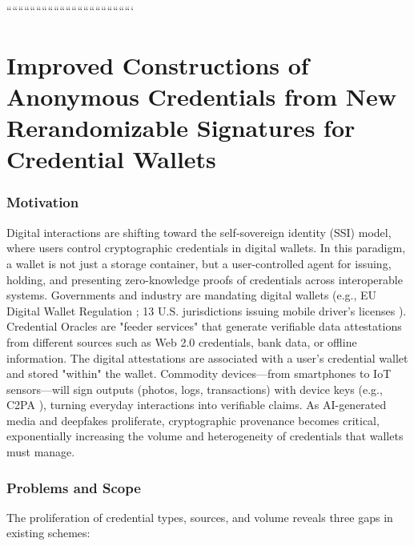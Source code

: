 ```````````````````````````````````````````\chapter{Improved Constructions of Anonymous Credentials from New Rerandomizable Signatures for Credential Wallets}\label{chap2}


\subsection{Motivation}

Digital interactions are shifting toward the self‑sovereign identity (SSI) model, where users control cryptographic credentials in digital wallets. In this paradigm, a wallet is not just a storage container, but a user-controlled agent for issuing, holding, and presenting zero-knowledge proofs of credentials across interoperable systems. Governments and industry are mandating digital wallets (e.g., EU Digital Wallet Regulation \cite{noauthor_regulation_2024}; 13 U.S. jurisdictions issuing mobile driver’s licenses \cite{aamva_jurisdiction_nodate}). Credential Oracles \cite{zhang_deco_2020, celi_distefano_2025} are "feeder services" that generate verifiable data attestations from different sources such as Web 2.0 credentials, bank data, or offline information.  The digital attestations are associated with a user's credential wallet and stored "within" the wallet. Commodity devices—from smartphones to IoT sensors—will sign outputs (photos, logs, transactions) with device keys (e.g., C2PA \cite{c2paorg_content_2024}), turning everyday interactions into verifiable claims. As AI-generated media and deepfakes proliferate, cryptographic provenance becomes critical, exponentially increasing the volume and heterogeneity of credentials that wallets must manage.



\subsection{Problems and Scope}

The proliferation of credential types, sources, and volume reveals three gaps in existing schemes:

